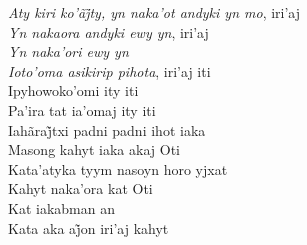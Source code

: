 \begin{linenumbers}\begingroup\raggedright
\noindent \emph{Aty kiri ko’ãj̃ty, yn naka’ot andyki yn mo}, iri’aj\\
\emph{Yn nakaora andyki ewy yn}, iri'aj\\
\emph{Yn naka'ori ewy yn}\\
\emph{Ioto'oma asikirip pihota}, iri'aj iti\\
Ipyhowoko'omi ity iti\\
Pa'ira tat ia'omaj ity iti\\
Iahãraj̃txi padni padni ihot iaka\\
Masong kahyt iaka akaj Oti\\
Kata'atyka tyym nasoyn horo yjxat\\
Kahyt naka'ora kat Oti\\
Kat iakabman an\\
Kata aka aj̃on iri’aj kahyt

\end{linenumbers}\endgroup

\bigskip

